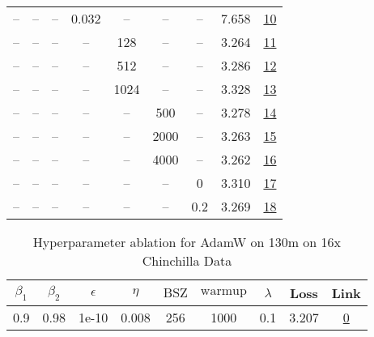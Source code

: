 \begin{table}[H]
\begin{tabular}{ccccccccc}
-- & -- & -- & 0.032 & -- & -- & -- & 7.658 & \href{https://wandb.ai/stanford-mercury/optimizer-scaling/runs/sweep-130m-21B-adamweac049lr0.032-wd0.1-minlr0-warmup1000-b10.9--cbb38e}{10} \\
-- & -- & -- & -- & 128 & -- & -- & 3.264 & \href{https://wandb.ai/stanford-mercury/optimizer-scaling/runs/sweep-130m-21B-adamw292ad2lr0.008-wd0.1-minlr0-warmup1000-b10.9--b88aa1}{11} \\
-- & -- & -- & -- & 512 & -- & -- & 3.286 & \href{https://wandb.ai/stanford-mercury/optimizer-scaling/runs/sweep-130m-21B-adamwdb2f8blr0.008-wd0.1-minlr0-warmup1000-b10.9--849bed}{12} \\
-- & -- & -- & -- & 1024 & -- & -- & 3.328 & \href{https://wandb.ai/stanford-mercury/optimizer-scaling/runs/sweep-130m-21B-adamwe4d6f6lr0.008-wd0.1-minlr0-warmup1000-b10.9--f0487d}{13} \\
-- & -- & -- & -- & -- & 500 & -- & 3.278 & \href{https://wandb.ai/stanford-mercury/optimizer-scaling/runs/sweep-130m-21B-adamw479b6elr0.008-wd0.1-minlr0-warmup500-b10.9-b-5842d3}{14} \\
-- & -- & -- & -- & -- & 2000 & -- & 3.263 & \href{https://wandb.ai/stanford-mercury/optimizer-scaling/runs/sweep-130m-21B-adamw28a1ddlr0.008-wd0.1-minlr0-warmup2000-b10.9--b21aed}{15} \\
-- & -- & -- & -- & -- & 4000 & -- & 3.262 & \href{https://wandb.ai/stanford-mercury/optimizer-scaling/runs/sweep-130m-21B-adamwb9e54alr0.008-wd0.1-minlr0-warmup4000-b10.9--74889b}{16} \\
-- & -- & -- & -- & -- & -- & 0 & 3.310 & \href{https://wandb.ai/stanford-mercury/optimizer-scaling/runs/sweep-130m-21B-adamw549010lr0.008-wd0-minlr0-warmup1000-b10.9-b2-c08f03}{17} \\
-- & -- & -- & -- & -- & -- & 0.2 & 3.269 & \href{https://wandb.ai/stanford-mercury/optimizer-scaling/runs/sweep-130m-21B-adamwe72844lr0.008-wd0.2-minlr0-warmup1000-b10.9--2b5e04}{18} \\
\bottomrule
\end{tabular}
\end{table}

\begin{table}[H]
\centering
\caption{Hyperparameter ablation for AdamW on 130m on 16x Chinchilla Data}
\label{tab:ablation_adamw_130m_16}
\begin{tabular}{ccccccccc}
\toprule
$\beta_1$ & $\beta_2$ & $\epsilon$ & $\eta$ & $\mathrm{BSZ}$ & $\mathrm{warmup}$ & $\lambda$ & Loss & Link \\
\midrule
0.9 & 0.98 & 1e-10 & 0.008 & 256 & 1000 & 0.1 & 3.207 & \href{https://wandb.ai/stanford-mercury/optimizer-scaling/runs/sweep-130m-42B-adamwdf6bfb1lr0.008-wd0.1-minlr0-warmup1000-b10.9-c5d61d}{0} \\
\midrule
\bottomrule
\end{tabular}
\end{table}

